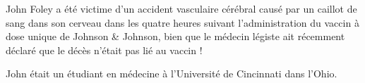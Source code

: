 John Foley a été victime d'un accident vasculaire cérébral causé par un caillot
de sang dans son cerveau dans les quatre heures suivant l'administration du
vaccin à dose unique de Johnson \& Johnson, bien que le médecin légiste ait
récemment déclaré que le décès n'était pas lié au vaccin !

John était un étudiant en médecine à l'Université de Cincinnati dans l'Ohio.

